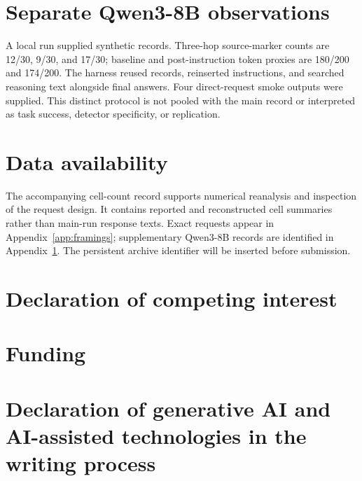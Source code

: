 \section{Separate Qwen3-8B observations}\label{app:qwen}

A local run supplied synthetic records. Three-hop source-marker counts are 12/30, 9/30, and 17/30; baseline and post-instruction token proxies are 180/200 and 174/200. The harness reused records, reinserted instructions, and searched reasoning text alongside final answers. Four direct-request smoke outputs were supplied. This distinct protocol is not pooled with the main record or interpreted as task success, detector specificity, or replication.
\section*{Data availability}
The accompanying cell-count record supports numerical reanalysis and inspection of the request design. It contains reported and reconstructed cell summaries rather than main-run response texts. Exact requests appear in Appendix~\ref{app:framings}; supplementary Qwen3-8B records are identified in Appendix~\ref{app:qwen}. The persistent archive identifier will be inserted before submission.

\section*{Declaration of competing interest}

\section*{Funding}

\section*{Declaration of generative AI and AI-assisted technologies in the writing process}

\printcredits



